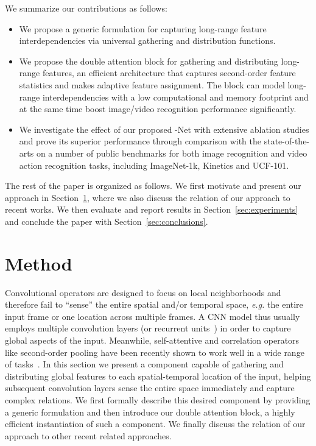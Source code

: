 \documentclass{article}
\begin{document}
We summarize our contributions as follows:
\begin{itemize}
\item We propose a generic formulation for capturing long-range feature interdependencies via universal gathering and distribution functions. 
\item We propose the double attention block for gathering and distributing long-range features, an efficient architecture that captures second-order feature statistics and makes adaptive feature assignment. The block can model long-range interdependencies with a low computational and memory footprint and at the same time boost image/video recognition performance significantly. 

\item We investigate the effect of our proposed -Net with extensive ablation studies and prove its superior performance through comparison with the state-of-the-arts on a number of public benchmarks for both image recognition and video action recognition tasks, including ImageNet-1k, Kinetics and UCF-101.
\end{itemize}

The rest of the paper is organized as follows. We first motivate and present our approach in Section~\ref{sec:method}, where we also discuss the relation of our approach to recent works. We then evaluate and report results in Section~\ref{sec:experiments} and conclude the paper with Section~\ref{sec:conclusions}.
 
\section{Method}
\label{sec:method}

Convolutional operators are designed to focus on local neighborhoods and therefore fail to ``sense'' the entire spatial and/or temporal space, \emph{e.g.} the entire input frame or one location across multiple frames. A CNN model thus usually employs multiple convolution layers (or recurrent units~\cite{donahue2015long,ng2015beyond}) in order to capture global aspects of the input. Meanwhile, self-attentive and correlation operators like second-order pooling have been recently shown to work well in a wide range of tasks~\cite{vaswani2017attention,li2017second,lin2015bilinear}. 
In this section we present a component capable of gathering and distributing global features to each spatial-temporal location of the input, helping subsequent convolution layers sense the entire space immediately and capture complex relations. We first formally describe this desired component by providing a generic formulation and then introduce our double attention block, a highly efficient instantiation of such a component. We finally discuss the relation of our approach to other recent related approaches.
\end{document}
